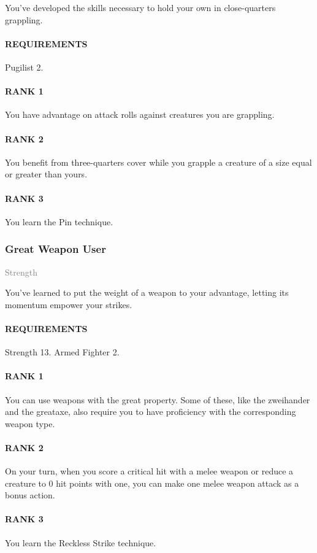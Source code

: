 \normalsize
You've developed the skills necessary to hold your own in close-quarters grappling.
\paragraph{REQUIREMENTS} Pugilist 2.
\paragraph{RANK 1} You have advantage on attack rolls against creatures you are grappling.
\paragraph{RANK 2} You benefit from three-quarters cover while you grapple a creature of a size equal or greater than yours.
\paragraph{RANK 3} You learn the Pin technique.

\subsubsection{Great Weapon User} \label{feat::greatweaponuser}
\small{\textcolor{gray}{Strength}}

\normalsize
You've learned to put the weight of a weapon to your advantage, letting its momentum empower your strikes.
\paragraph{REQUIREMENTS} Strength 13. Armed Fighter 2.
\paragraph{RANK 1} You can use weapons with the great property.
Some of these, like the zweihander and the greataxe, also require you to have proficiency with the corresponding weapon type.
\paragraph{RANK 2} On your turn, when you score a critical hit with a melee weapon or reduce a creature to 0 hit points with one, you can make one melee weapon attack as a bonus action.
\paragraph{RANK 3} You learn the Reckless Strike technique.

